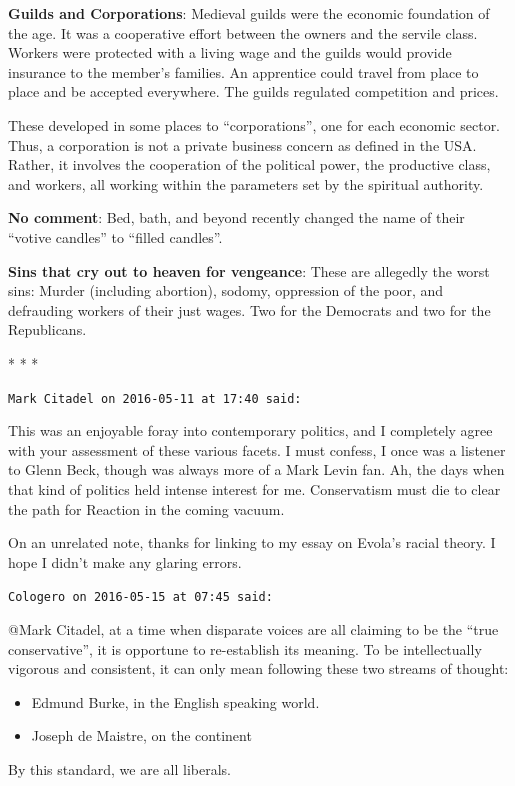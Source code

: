 \textbf{Guilds and Corporations}: Medieval guilds were the economic foundation of the age. It was a cooperative effort between the owners and the servile class. Workers were protected with a living wage and the guilds would provide insurance to the member's families. An apprentice could travel from place to place and be accepted everywhere. The guilds regulated competition and prices.

These developed in some places to ``corporations'', one for each economic sector. Thus, a corporation is not a private business concern as defined in the USA. Rather, it involves the cooperation of the political power, the productive class, and workers, all working within the parameters set by the spiritual authority.

\textbf{No comment}: Bed, bath, and beyond recently changed the name of their ``votive candles'' to ``filled candles''.

\textbf{Sins that cry out to heaven for vengeance}: These are allegedly the worst sins: Murder (including abortion), sodomy, oppression of the poor, and defrauding workers of their just wages. Two for the Democrats and two for the Republicans.



\begin{center}* * *\end{center}

\begin{footnotesize}
\begin{sffamily}
\texttt{Mark Citadel on 2016-05-11 at 17:40 said:}

This was an enjoyable foray into contemporary politics, and I completely agree with your assessment of these various facets. I must confess, I once was a listener to Glenn Beck, though was always more of a Mark Levin fan. Ah, the days when that kind of politics held intense interest for me. Conservatism must die to clear the path for Reaction in the coming vacuum.

On an unrelated note, thanks for linking to my essay on Evola's racial theory. I hope I didn't make any glaring errors.

\hfill

\texttt{Cologero on 2016-05-15 at 07:45 said:}

@Mark Citadel, at a time when disparate voices are all claiming to be the ``true conservative'', it is opportune to re-establish its meaning. To be intellectually vigorous and consistent, it can only mean following these two streams of thought:

\begin{itemize}


\item Edmund Burke, in the English speaking world.

\item Joseph de Maistre, on the continent
\end{itemize}


By this standard, we are all liberals.

\end{sffamily}
\end{footnotesize}

